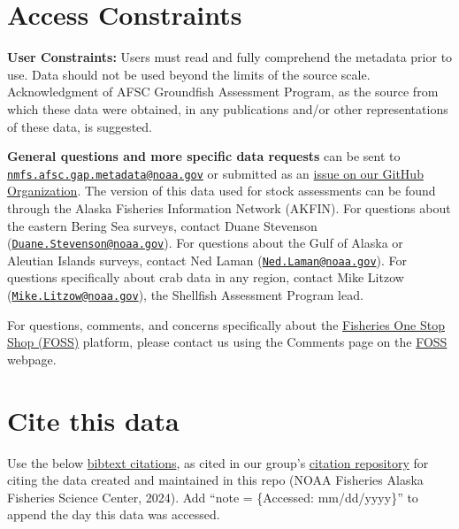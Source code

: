 \documentclass[
  letterpaper,
  oneside,
  open=any]{scrbook}
\begin{document}
\hypertarget{access-constraints-1}{%
\section*{Access Constraints}\label{access-constraints-1}}


\textbf{User Constraints:} Users must read and fully comprehend the
metadata prior to use. Data should not be used beyond the limits of the
source scale. Acknowledgment of AFSC Groundfish Assessment Program, as
the source from which these data were obtained, in any publications
and/or other representations of these data, is suggested.

\textbf{General questions and more specific data requests} can be sent
to
\href{mailto:nmfs.afsc.gap.metadata@noaa.gov}{\nolinkurl{nmfs.afsc.gap.metadata@noaa.gov}}
or submitted as an
\href{https://github.com/afsc-gap-products/data-requests}{issue on our
GitHub Organization}. The version of this data used for stock
assessments can be found through the Alaska Fisheries Information
Network (AKFIN). For questions about the eastern Bering Sea surveys,
contact Duane Stevenson
(\href{mailto:Duane.Stevenson@noaa.gov}{\nolinkurl{Duane.Stevenson@noaa.gov}}).
For questions about the Gulf of Alaska or Aleutian Islands surveys,
contact Ned Laman
(\href{mailto:Ned.Laman@noaa.gov}{\nolinkurl{Ned.Laman@noaa.gov}}). For
questions specifically about crab data in any region, contact Mike
Litzow
(\href{mailto:Mike.Litzow@noaa.gov}{\nolinkurl{Mike.Litzow@noaa.gov}}),
the Shellfish Assessment Program lead.

For questions, comments, and concerns specifically about the
\href{https://www.fisheries.noaa.gov/foss}{Fisheries One Stop Shop
(FOSS)} platform, please contact us using the Comments page on the
\href{https://www.fisheries.noaa.gov/foss}{FOSS} webpage.

\hypertarget{cite-this-data-3}{%
\section*{Cite this data}\label{cite-this-data-3}}


Use the below
\href{https://github.com/afsc-gap-products/gap_products/blob/main/code/CITATION_FOSSAFSCData.bib}{bibtext
citations}, as cited in our group's
\href{https://github.com/afsc-gap-products/citations/blob/main/cite/bibliography.bib}{citation
repository} for citing the data created and maintained in this repo
(NOAA Fisheries Alaska Fisheries Science Center, 2024). Add ``note =
\{Accessed: mm/dd/yyyy\}'' to append the day this data was accessed.
\end{document}
